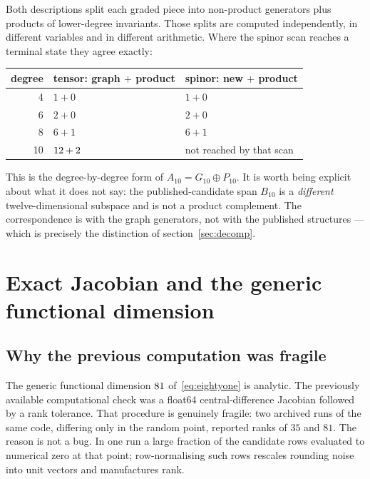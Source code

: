 \documentclass[11pt,a4paper]{article}
\begin{document}
Both descriptions split each graded piece into non-product generators plus
products of lower-degree invariants. Those splits are computed independently, in
different variables and in different arithmetic. Where the spinor scan reaches a
terminal state they agree exactly:

\begin{center}
\begin{tabular}{rll}
\toprule
degree & tensor: graph $+$ product & spinor: new $+$ product \\
\midrule
4 & $1 + 0$ & $1 + 0$ \\
6 & $2 + 0$ & $2 + 0$ \\
8 & $6 + 1$ & $6 + 1$ \\
10 & $12 + 2$ & not reached by that scan \\
\bottomrule
\end{tabular}
\end{center}

This is the degree-by-degree form of $A_{10} = G_{10}\oplus P_{10}$. It is worth
being explicit about what it does not say: the published-candidate span $B_{10}$
is a \emph{different} twelve-dimensional subspace and is not a product
complement. The correspondence is with the graph generators, not with the
published structures --- which is precisely the distinction of
section~\ref{sec:decomp}.

\section{Exact Jacobian and the generic functional dimension}
\label{sec:jacobian}

\subsection{Why the previous computation was fragile}

The generic functional dimension $81$
of~\eqref{eq:eightyone} is analytic. The previously available computational check
was a float64 central-difference Jacobian followed by a rank tolerance. That
procedure is genuinely fragile: two archived runs of the same code, differing
only in the random point, reported ranks of $35$ and $81$. The reason is not a
bug. In one run a large fraction of the candidate rows evaluated to numerical
zero at that point; row-normalising such rows rescales rounding noise into unit
vectors and manufactures rank.
\end{document}
